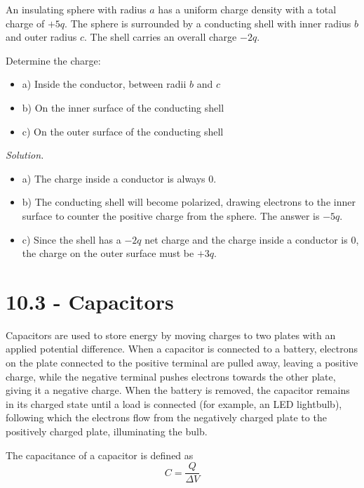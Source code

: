 \documentclass[12pt, titlepage]{article}
\begin{document}
\begin{Problem}
    An insulating sphere with radius $a$ has a uniform charge density with a total charge of $+5q$. The sphere is surrounded by a conducting shell with inner radius $b$ and outer radius $c$. The shell carries an overall charge $-2q$.

    Determine the charge:
    \begin{itemize}
        \item[] a) Inside the conductor, between radii $b$ and $c$
        \item[] b) On the inner surface of the conducting shell
        \item[] c) On the outer surface of the conducting shell
    \end{itemize}

    \tcblower

    \textit{Solution. }
    \begin{itemize}
        \item[] a) The charge inside a conductor is always 0.
        \item[] b) The conducting shell will become polarized, drawing electrons to the inner surface to counter the positive charge from the sphere. The answer is $-5q$.
        \item[] c) Since the shell has a $-2q$ net charge and the charge inside a conductor is 0, the charge on the outer surface must be $+3q$.
    \end{itemize}
\end{Problem}

\section*{10.3 - Capacitors}

Capacitors are used to store energy by moving charges to two plates with an applied potential difference. When a capacitor is connected to a battery, electrons on the plate connected to the positive terminal are pulled away, leaving a positive charge, while the negative terminal pushes electrons towards the other plate, giving it a negative charge. When the battery is removed, the capacitor remains in its charged state until a load is connected (for example, an LED lightbulb), following which the electrons flow from the negatively charged plate to the positively charged plate, illuminating the bulb.

The capacitance of a capacitor is defined as 
\begin{equation*}
    C= \frac{Q}{\Delta V}
\end{equation*}
\end{document}
